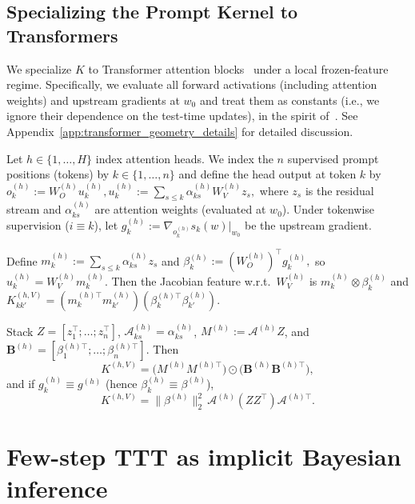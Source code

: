 \documentclass{article}
\theoremstyle{plain}
\theoremstyle{definition}
\theoremstyle{remark}
\begin{document}
\subsection{Specializing the Prompt Kernel to Transformers}
\label{subsec:transformer_geometry}

We specialize $K$ to Transformer attention blocks~\citep{vaswani2017attention} under a local frozen-feature regime. Specifically, we evaluate all forward activations (including attention weights) and upstream gradients at $w_0$ and treat them as constants (i.e., we ignore their dependence on the test-time updates), in the spirit of~\citet[][]{chizat2019lazy,fu2023single_attention}. See Appendix~\ref{app:transformer_geometry_details} for detailed discussion.

Let $h\in\{1,\dots,H\}$ index attention heads. We index the $n$ supervised prompt positions (tokens) by $k\in\{1,\dots,n\}$ and define the head output at token $k$ by
\(
o_k^{(h)} := W_O^{(h)} u_k^{(h)},
u_k^{(h)} := \sum_{s\le k}\alpha_{ks}^{(h)}W_V^{(h)} z_s ,
\)
where $z_s$ is the residual stream and $\alpha_{ks}^{(h)}$ are attention weights (evaluated at $w_0$). Under tokenwise supervision ($i\equiv k$), let $g_k^{(h)} :=\nabla_{o_k^{(h)}} s_k(w)\big|_{w_0}$ be the upstream gradient.


Define \(m_k^{(h)}:=\sum_{s\le k}\alpha_{ks}^{(h)} z_s\) and \(
\beta_k^{(h)}:=(W_O^{(h)})^\top g_k^{(h)},\) so $u_k^{(h)}=W_V^{(h)}m_k^{(h)}.$ Then the Jacobian feature w.r.t.\ $W_V^{(h)}$ is $m_k^{(h)}\otimes \beta_k^{(h)}$ and $K^{(h,V)}_{kk'}=(m_k^{(h)\top}m_{k'}^{(h)})(\beta_k^{(h)\top}\beta_{k'}^{(h)})$.


Stack $Z=[z_1^\top;\dots;z_n^\top]$, $\mathcal{A}^{(h)}_{ks}=\alpha^{(h)}_{ks}$, $M^{(h)}:=\mathcal{A}^{(h)}Z$, and $\mathbf{B}^{(h)}=[\beta_1^{(h)\top};\dots;\beta_n^{(h)\top}]$.
Then
\begin{equation}
K^{(h,V)}=\bigl(M^{(h)}M^{(h)\top}\bigr)\odot\bigl(\mathbf{B}^{(h)}\mathbf{B}^{(h)\top}\bigr),
\label{eq:KV_hadamard}
\end{equation}
and if $g_k^{(h)}\equiv g^{(h)}$ (hence $\beta_k^{(h)}\equiv \beta^{(h)}$),
\begin{equation}
K^{(h,V)}
=\|\beta^{(h)}\|_2^2\,\mathcal{A}^{(h)}(ZZ^\top)\mathcal{A}^{(h)\top}.
\label{eq:KV_sandwich_globalbeta}
\end{equation}


\section{Few-step TTT as implicit Bayesian inference}
\label{sec:spectral_and_prior}
\end{document}
